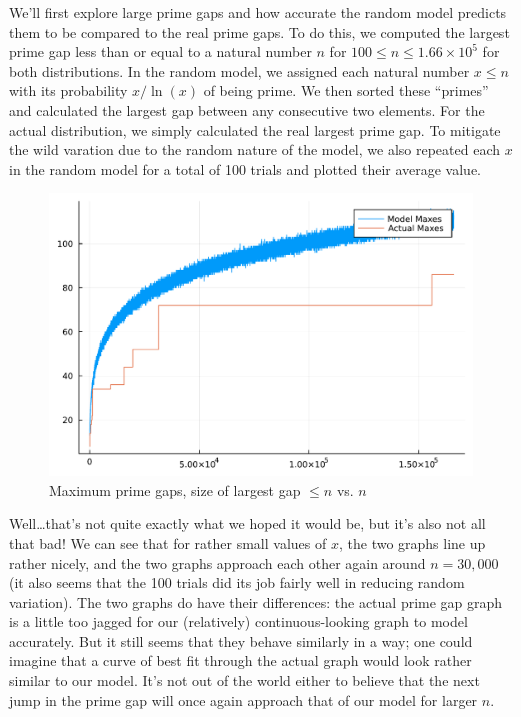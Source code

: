\documentclass[conference]{IEEEtran}
\begin{document}
We'll first explore large prime gaps and how accurate the
random model predicts them to be compared to the real
prime gaps. To do this, we computed the largest prime gap
less than or equal to a natural number $n$ for
$100 \le n \le 1.66 \times 10^5$ for both distributions.
In the random model, we assigned each natural number $x \le n$
with its probability $x/\ln(x)$ of being prime. We then sorted
these ``primes'' and calculated the largest gap between
any consecutive two elements. For the actual distribution, we
simply calculated the real largest prime gap. To mitigate the wild
varation due to the random nature of the model, we also repeated
each $x$ in the random model for a total of 100 trials and
plotted their average value.

\begin{figure}[H]
  \centering
  \includegraphics[width=\linewidth,keepaspectratio]{random-plot1.pdf}
  \caption{Maximum prime gaps, size of largest gap $\le n$ vs. $n$}
\end{figure}

Well\ldots that's not quite exactly what we hoped it would be,
but it's also not all that bad! We can see that for rather
small values of $x$, the two graphs line up rather nicely,
and the two graphs approach each other again around $n = 30{,}000$
(it also seems that the 100 trials did its job fairly well in reducing
random variation). The two graphs do have their differences:
the actual prime gap graph is a little too jagged for our
(relatively) continuous-looking graph to model accurately. But it
still seems that they behave similarly in a way; one could imagine that
a curve of best fit through the actual graph would look rather similar
to our model. It's not out of the world either to believe that the next
jump in the prime gap will once again approach that of
our model for larger $n$.
\end{document}
